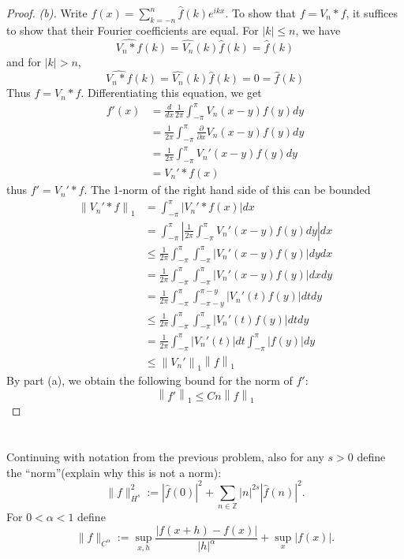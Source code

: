 \documentclass{article}
\newcommand{\norm}[1]{\left\|#1\right\|}
\theoremstyle{definition} %
\numberwithin{thm}{section} %
\theoremstyle{definition} %
\begin{document}
\begin{proof}
\textit{(b).}
Write $f(x) = \sum_{k = -n}^n \hat{f}(k)e^{ikx}$. To show that 
$f = V_n * f$, it suffices to show that their Fourier coefficients
are equal. For $|k| \leq n$, we have
\[
    \widehat{V_n * f}(k) = \hat{V_n}(k)\hat{f}(k) = \hat{f}(k)
\]
and for $|k| > n$,
\[
    \widehat{V_n * f}(k) = \hat{V_n}(k)\hat{f}(k) = 0 = \hat{f}(k)
\]
Thus $f = V_n * f$. Differentiating this equation, we get
\begin{align*}
    f'(x)
    &= \frac{d}{dx}\frac{1}{2\pi}\int_{-\pi}^\pi 
    V_n(x - y)f(y) dy \\
    &= \frac{1}{2\pi}\int_{-\pi}^\pi \frac{\partial}{\partial x}
    V_n(x - y)f(y) dy \\
    &= \frac{1}{2\pi}\int_{-\pi}^\pi 
    V_n'(x - y)f(y) dy \\
    &= V_n' * f(x)
\end{align*}
thus $f' = V_n' * f$. 
The 1-norm of the right hand side of this can be bounded
\begin{align*}
    \norm{V_n' * f}_1
    &= \int_{-\pi}^\pi |V_n' * f(x)|dx \\
    &= \int_{-\pi}^\pi \left|\frac{1}{2\pi}\int_{-\pi}^\pi 
    V_n'(x - y)f(y) dy\right|dx \\
    &\leq \frac{1}{2\pi}\int_{-\pi}^\pi \int_{-\pi}^\pi 
    \left|V_n'(x - y)f(y)\right|dydx \\
    &= \frac{1}{2\pi}\int_{-\pi}^\pi \int_{-\pi}^\pi 
    \left|V_n'(x - y)f(y)\right|dxdy \\
    &= \frac{1}{2\pi}\int_{-\pi}^\pi \int_{-\pi - y}^{\pi - y} 
    \left|V_n'(t)f(y)\right|dtdy \\
    &\leq \frac{1}{2\pi}\int_{-\pi}^\pi \int_{-\pi}^{\pi} 
    \left|V_n'(t)f(y)\right|dtdy \\
    &= \frac{1}{2\pi}\int_{-\pi}^\pi 
    \left|V_n'(t)\right|dt\int_{-\pi}^{\pi} 
    \left|f(y)\right|dy \\
    &\leq \norm{V_n'}_1\norm{f}_1
\end{align*}
By part (a), we obtain the following bound for the norm of $f'$:
\[
    \norm{f'}_1 \leq Cn\norm{f}_1
\]
\end{proof}

\section{}

Continuing with notation from the previous problem, also for any $s > 0$ define the \textquotedblleft norm\textquotedblright (explain why this is not a norm):
\[
\|f\|_{H^s}^2 := |\hat{f}(0)|^2 + \sum_{n \in \mathbb{Z}} |n|^{2s} |\hat{f}(n)|^2.
\]
For $0 < \alpha < 1$ define
\[
\|f\|_{C^\alpha} := \sup_{x,h} \frac{|f(x+h) - f(x)|}{|h|^\alpha} + \sup_x |f(x)|.
\]
\end{document}
